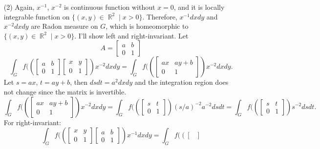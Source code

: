 \documentclass{article}
\DeclareMathOperator{\rr}{\mathbb{R}}
\begin{document}
\begin{enumerate}
\item[(2)]Again, $x^{-1}$, $x^{-2}$ is continuous function without $x=0$, and it is locally integrable function on $\{(x,y)\in\rr^2\mid x>0\}$. Therefore, $x^{-1}dxdy$ and $x^{-2}dxdy$ are Radon measure on $G$, which is homeomorphic to $\{(x,y)\in\rr^2\mid x>0\}$. I'll show left and right-invariant. Let
\begin{equation*}
A=\begin{bmatrix}
a & b \\
0 & 1
\end{bmatrix}
\end{equation*}
\begin{equation*}
\int_G f(\left(\begin{bmatrix}
a & b \\
0 & 1
\end{bmatrix}\begin{bmatrix}
x & y \\
0 & 1
\end{bmatrix}\right)x^{-2}dxdy=\int_G f(\left(\begin{bmatrix}
ax & ay+b \\
0 & 1
\end{bmatrix}\right)x^{-2}dxdy.
\end{equation*}
Let $s=ax$, $t=ay+b$, then $dsdt=a^2dxdy$ and the integration region does not change since the matrix is invertible.
\begin{equation*}
\int_G f(\left(\begin{bmatrix}
ax & ay+b \\
0 & 1
\end{bmatrix}\right)x^{-2}dxdy=\int_G f(\left(\begin{bmatrix}
s & t \\
0 & 1
\end{bmatrix}\right)(s/a)^{-2}a^{-2}dsdt=\int_G f(\left(\begin{bmatrix}
s & t \\
0 & 1
\end{bmatrix}\right)s^{-2}dsdt.
\end{equation*}
For right-invariant:
\begin{equation*}
\int_G f(\left(\begin{bmatrix}
x & y \\
0 & 1
\end{bmatrix}\begin{bmatrix}
a & b \\
0 & 1
\end{bmatrix}\right)x^{-1}dxdy=\int_G f(\left(\begin{bmatrix}

\end{bmatrix}
\end{equation*}
\end{enumerate}
\end{document}
